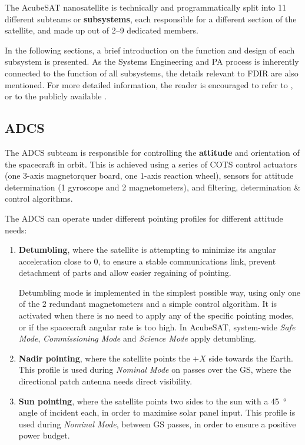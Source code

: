 \documentclass[a4paper,nobib]{tufte-book}
\begin{document}
The AcubeSAT nanosatellite is technically and programmatically split into 11 different subteams or \textbf{subsystems}, each responsible for a different section of the satellite, and made up out of \SIrange{2}{9}{} dedicated members.

In the following sections, a brief introduction on the function and design of each subsystem is presented. As the Systems Engineering and \acl{PA} process is inherently connected to the function of all subsystems, the details relevant to \acs{FDIR} are also mentioned. For more detailed information, the reader is encouraged to refer to , or to the publicly available .
\subsection{\acf{ADCS}}
\label{sec:adcs}

The \ac{ADCS} subteam is responsible for controlling the \textbf{attitude} and orientation of the spacecraft in orbit. This is achieved using a series of \ac{COTS} control actuators (one 3-axis magnetorquer board, one 1-axis reaction wheel), sensors for attitude determination (1 gyroscope and 2 magnetometers), and filtering, determination \& control algorithms.\autocite{DDJF_AOCS}

The \ac{ADCS} can operate under different pointing profiles for different attitude needs:
\begin{enumerate}
	\item \textbf{Detumbling}, where the satellite is attempting to minimize its angular acceleration close to 0, to ensure a stable communications link, prevent detachment of parts and allow easier regaining of pointing.
	
	Detumbling mode is implemented in the simplest possible way, using only one of the 2 redundant magnetometers and a simple control algorithm. It is activated when there is no need to apply any of the specific pointing modes, or if the spacecraft angular rate is too high. In AcubeSAT, system-wide \emph{Safe Mode}, \emph{Commissioning Mode} and \emph{Science Mode} apply detumbling.
	
	\item \textbf{Nadir pointing}, where the satellite points the \(+X\) side towards the Earth. This profile is used during \emph{Nominal Mode} on passes over the \acl{GS}, where the directional patch antenna needs direct visibility.
	
	\item \textbf{Sun pointing}, where the satellite points two sides to the sun with a \SI{45}{\degree} angle of incident each, in order to maximise solar panel input. This profile is used during \emph{Nominal Mode}, between \ac{GS} passes, in order to ensure a positive power budget.
\end{enumerate}
\end{document}
